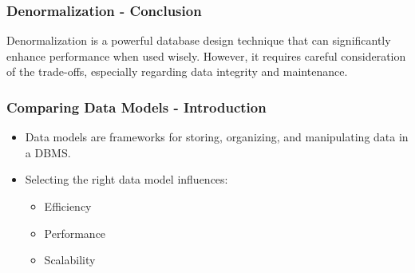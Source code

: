 \documentclass[aspectratio=169]{beamer}
\begin{document}
\begin{frame}[fragile]
    \frametitle{Denormalization - Conclusion}
    Denormalization is a powerful database design technique that can significantly enhance performance when used wisely. However, it requires careful consideration of the trade-offs, especially regarding data integrity and maintenance.
\end{frame}

\begin{frame}[fragile]
    \frametitle{Comparing Data Models - Introduction}
    \begin{itemize}
        \item Data models are frameworks for storing, organizing, and manipulating data in a DBMS.
        \item Selecting the right data model influences:
        \begin{itemize}
            \item Efficiency 
            \item Performance 
            \item Scalability 
        \end{itemize}
    \end{itemize}
\end{frame}
\end{document}
